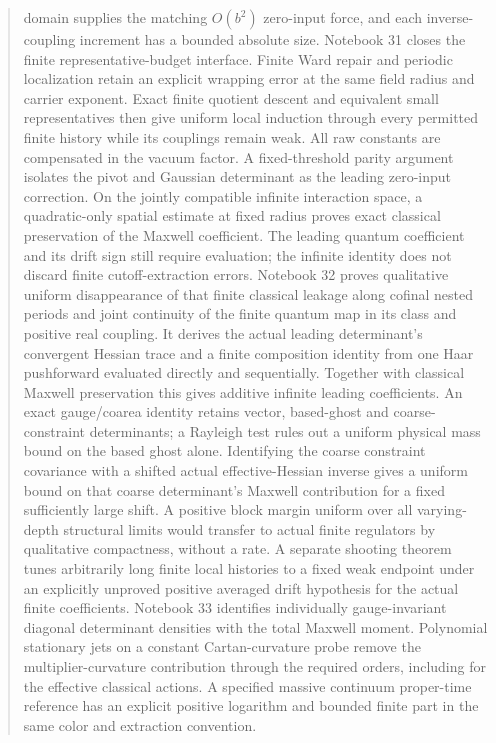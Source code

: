 \documentclass[11pt]{article}
\theoremstyle{remark}
\begin{document}
\begin{abstract}
domain supplies the matching \(O(b^2)\) zero-input force, and
each inverse-coupling increment has a bounded absolute size.
Notebook 31 closes the finite representative-budget interface.
Finite Ward repair and periodic localization retain an explicit
wrapping error at the same field radius and carrier exponent.
Exact finite quotient descent and equivalent small representatives
then give uniform local induction through every permitted finite
history while its couplings remain weak. All raw constants are
compensated in the vacuum factor. A fixed-threshold parity
argument isolates the pivot and Gaussian determinant as the
leading zero-input correction. On the jointly compatible infinite
interaction space, a quadratic-only spatial estimate at fixed
radius proves exact classical preservation of the Maxwell
coefficient. The leading quantum coefficient and its drift sign
still require evaluation; the infinite identity does not discard
finite cutoff-extraction errors.
Notebook 32 proves qualitative uniform disappearance of that
finite classical leakage along cofinal nested periods and joint
continuity of the finite quantum map in its class and positive
real coupling. It derives the actual leading determinant's
convergent Hessian trace and a finite composition identity from
one Haar pushforward evaluated directly and sequentially.
Together with classical Maxwell preservation this gives additive
infinite leading coefficients. An exact gauge/coarea identity
retains vector, based-ghost and coarse-constraint determinants;
a Rayleigh test rules out a uniform physical mass bound on the
based ghost alone. Identifying the coarse constraint covariance
with a shifted actual effective-Hessian inverse gives a uniform
bound on that coarse determinant's Maxwell contribution for a
fixed sufficiently large shift. A positive block margin uniform over all
varying-depth structural limits would transfer to actual finite
regulators by qualitative compactness, without a rate.
A separate shooting theorem tunes
arbitrarily long finite local histories to a fixed weak endpoint
under an explicitly unproved positive averaged drift hypothesis
for the actual finite coefficients.
Notebook 33 identifies individually gauge-invariant diagonal
determinant densities with the total Maxwell moment. Polynomial
stationary jets on a constant Cartan-curvature probe remove the
multiplier-curvature contribution through the required orders,
including for the effective classical actions. A specified massive
continuum proper-time reference has an explicit positive logarithm
and bounded finite part in the same color and extraction convention.

\end{abstract}
\end{document}

